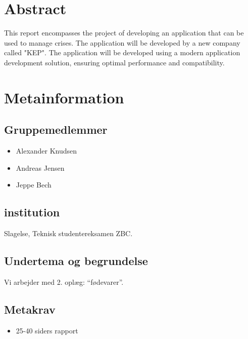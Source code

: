 \section{Abstract}
This report encompasses the project of developing an application that can be used to manage crises. The application will be developed by a new company called "KEP". 
The application will be developed using a modern application development solution, ensuring optimal performance and compatibility.

\newpage

\section{Metainformation}
\subsection{Gruppemedlemmer}
\begin{itemize}
  \item Alexander Knudsen
  \item Andreas Jensen
  \item Jeppe Bech
\end{itemize}
\subsection{institution}
Slagelse, Teknisk studentereksamen ZBC.
\subsection{Undertema og begrundelse}
Vi arbejder med 2. oplæg: ``fødevarer''.
\subsection{Metakrav}
\begin{itemize}
  \item 25-40 siders rapport
\end{itemize}
